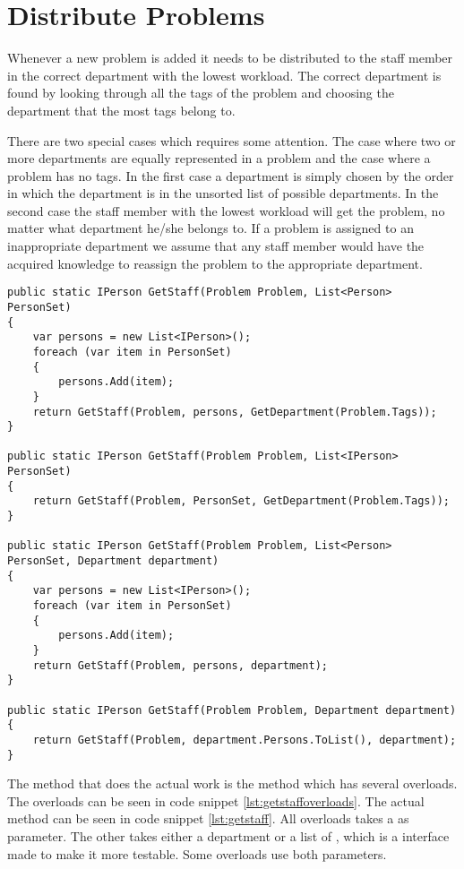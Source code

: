 \section{Distribute Problems}
\label{sec:dispro}
Whenever a new problem is added it needs to be distributed to the staff member in the correct department with the lowest workload. 
The correct department is found by looking through all the tags of the problem and choosing the department that the most tags belong to.

There are two special cases which requires some attention. 
The case where two or more departments are equally represented in a problem and the case where a problem has no tags. 
In the first case a department is simply chosen by the order in which the department is in the unsorted list of possible departments. 
In the second case the staff member with the lowest workload will get the problem, no matter what department he/she belongs to.
If a problem is assigned to an inappropriate department we assume that any staff member would have the acquired knowledge to reassign the problem to the appropriate department. 


\begin{lstlisting}[style=sourceCode, caption=\myCaption{The overloads for the \me{GetStaff()} method}, label=lst:getstaffoverloads,float=h]
public static IPerson GetStaff(Problem Problem, List<Person> PersonSet)
{
    var persons = new List<IPerson>();
    foreach (var item in PersonSet)
    {
        persons.Add(item);
    }
    return GetStaff(Problem, persons, GetDepartment(Problem.Tags));
}

public static IPerson GetStaff(Problem Problem, List<IPerson> PersonSet)
{
    return GetStaff(Problem, PersonSet, GetDepartment(Problem.Tags));
}

public static IPerson GetStaff(Problem Problem, List<Person> PersonSet, Department department)
{
    var persons = new List<IPerson>();
    foreach (var item in PersonSet)
    {
        persons.Add(item);
    }
    return GetStaff(Problem, persons, department);
}

public static IPerson GetStaff(Problem Problem, Department department)
{
    return GetStaff(Problem, department.Persons.ToList(), department);
}
\end{lstlisting}
The method that does the actual work is the  method which has several overloads. The overloads can be seen in code snippet \ref{lst:getstaffoverloads}. The actual method can be seen in code snippet \ref{lst:getstaff}. 
All overloads takes a  as parameter. 
The other takes either a department or a list of , which is a  interface made to make it more testable. 
Some overloads use both parameters.

